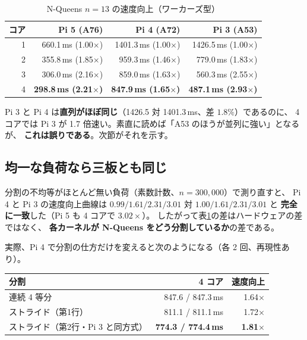 \documentclass[a4paper,11pt]{ltjsarticle}
\begin{document}
\begin{table}[t]
\centering
\caption{N-Queens $n=13$ の速度向上（ワーカーズ型）}
\label{tab:nq}
\begin{tabular}{rrrr}
\toprule
コア & Pi 5 (A76) & Pi 4 (A72) & Pi 3 (A53) \\
\midrule
1 & 660.1\,ms (1.00$\times$) & 1401.3\,ms (1.00$\times$) & 1426.5\,ms (1.00$\times$) \\
2 & 355.8\,ms (1.85$\times$) & 959.3\,ms (1.46$\times$) & 779.0\,ms (1.83$\times$) \\
3 & 306.0\,ms (2.16$\times$) & 859.0\,ms (1.63$\times$) & 560.3\,ms (2.55$\times$) \\
4 & \textbf{298.8\,ms (2.21}$\times$\textbf{)} & \textbf{847.9\,ms (1.65}$\times$\textbf{)}
  & \textbf{487.1\,ms (2.93}$\times$\textbf{)} \\
\bottomrule
\end{tabular}
\end{table}

Pi 3 と Pi 4 は\textbf{直列がほぼ同じ}（1426.5 対 1401.3\,ms、差 $1.8\%$）であるのに、
4 コアでは Pi 3 が 1.7 倍速い。素直に読めば「A53 のほうが並列に強い」となるが、
\textbf{これは誤りである}。次節がそれを示す。

\subsection{均一な負荷なら三板とも同じ}
分割の不均等がほとんど無い負荷（素数計数、$n=300{,}000$）で測り直すと、
Pi 4 と Pi 3 の速度向上曲線は $0.99/1.61/2.31/3.01$ 対 $1.00/1.61/2.31/3.01$ と
\textbf{完全に一致}した（Pi 5 も 4 コアで $3.02\times$）。
したがって表\ref{tab:nq}の差はハードウェアの差ではなく、
\textbf{各カーネルが N-Queens をどう分割しているか}の差である。

実際、Pi 4 で分割の仕方だけを変えると次のようになる（各 2 回、再現性あり）。

\begin{center}
\begin{tabular}{lrr}
\toprule
分割 & 4 コア & 速度向上 \\
\midrule
連続 4 等分 & 847.6 / 847.3\,ms & 1.64$\times$ \\
ストライド（第1行） & 811.1 / 811.1\,ms & 1.72$\times$ \\
ストライド（第2行・Pi 3 と同方式） & \textbf{774.3 / 774.4\,ms} & \textbf{1.81}$\times$ \\
\bottomrule
\end{tabular}
\end{center}
\end{document}
